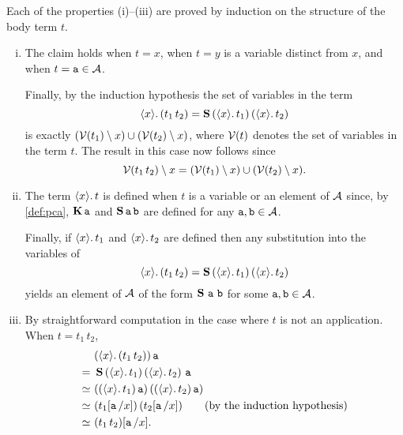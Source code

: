 


Each of the properties (i)--(iii) are proved by induction on the structure of the
body term \(t\).

\begin{enumerate}[(i)]
  \item
    The claim holds when \(t = x\),
    when \(t = y\) is a variable distinct from \(x\),
    and when \(t = \pca a \in \AA\).

    Finally, by the induction hypothesis the set of variables in the term
    \[ \lambdapca{x}{(t_1\,t_2)} =
      \scomb\,(\lambdapca{x}{t_1})\,(\lambdapca{x}{t_2}) \]
    is exactly
    \((\Var{t_1} \setminus x) \cup (\Var{t_2} \setminus x)\),
    where \(\Var t\) denotes the set of variables in the term \(t\).
    The result in this case now follows since
    \[ \Var{t_1\,t_2} \setminus x =
      (\Var{t_1} \setminus x) \cup (\Var{t_2} \setminus x). \]

  \item
    The term \(\lambdapca{x}{t}\) is defined when \(t\) is a variable or an
    element of \(\AA\) since, by \cref{def:pca}, \(\kcomb \pca a\) and
    \(\scomb \pca a \pca b\) are defined for any \(\pca a, \pca b \in \AA\).

    Finally, if \(\lambdapca{x}{t_1}\) and \(\lambdapca{x}{t_2}\) are
    defined then any substitution into the variables of
    \[ \lambdapca{x}{(t_1\,t_2)} =
      \scomb\,(\lambdapca{x}{t_1})\,(\lambdapca{x}{t_2}) \]
    yields an element of \(\AA\) of the form \(\scomb\,\pca a\,\pca b\)
    for some $\pca a, \pca b \in \AA$.

  \item
    By straightforward computation in the case where \(t\) is not an
    application.
    When \(t = t_1\,t_2\),
    \begin{align*}
         & (\lambdapca{x}{(t_1\,t_2)}) \pca a \\
      =\ & \scomb \, (\lambdapca{x}{t_1}) \, (\lambdapca{x}{t_2}) \, \pca a \\
      \simeq\ & ((\lambdapca{x}{t_1}) \pca a) \, ((\lambdapca{x}{t_2}) \pca a) \\
      \simeq\ & (t_1[\pca a/x]) \, (t_2[\pca a/x])
        \qquad \text{(by the induction hypothesis)} \\
      \simeq\ & (t_1\,t_2)[\pca a/x].
    \end{align*}
\end{enumerate}


